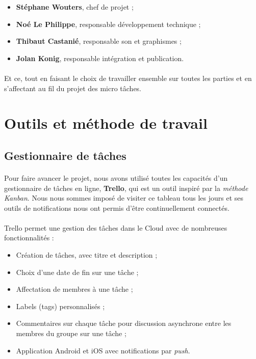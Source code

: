 \begin{itemize}
\item \textbf{Stéphane Wouters}, chef de projet ;
\item \textbf{Noé Le Philippe}, responsable développement technique ;
\item \textbf{Thibaut Castanié}, responsable son et graphismes ;
\item \textbf{Jolan Konig}, responsable intégration et publication.
\end{itemize}

\paragraph{}
Et ce, tout en faisant le choix de travailler ensemble sur toutes les parties et en s’affectant au fil du projet des micro tâches.

\section{Outils et méthode de travail}

\subsection{Gestionnaire de tâches}

\paragraph{}
Pour faire avancer le projet, nous avons utilisé toutes les capacités d’un gestionnaire de tâches en ligne, \textbf{Trello}, qui est un outil inspiré par la \textit{méthode Kanban}. Nous nous sommes imposé de visiter ce tableau tous les jours et ses outils de notifications nous ont permis d’être continuellement connectés.

\paragraph{}
Trello permet une gestion des tâches dans le Cloud avec de nombreuses fonctionnalités :
\begin{itemize}
\item Création de tâches, avec titre et description ;
\item Choix d’une date de fin sur une tâche ;
\item Affectation de membres à une tâche ;
\item Labels (tags) personnalisés ;
\item Commentaires sur chaque tâche pour discussion asynchrone entre les membres du groupe sur une tâche ;
\item Application Android et iOS avec notifications par \textit{push}.
\end{itemize}

